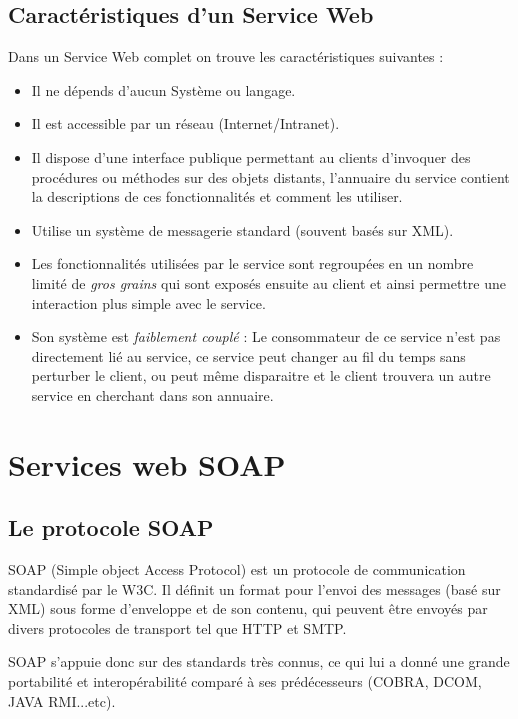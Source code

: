 		\subsection{Caractéristiques d'un Service Web}
		Dans un Service Web complet on trouve les caractéristiques suivantes :\cite{refTutorialPointsWS}
		\begin{itemize}
		\item Il ne dépends d'aucun Système ou langage.
		\item Il est accessible par un réseau (Internet/Intranet).
		\item Il dispose d'une interface publique permettant au clients d'invoquer des procédures ou méthodes sur des objets distants, l'annuaire du service contient la descriptions de ces fonctionnalités et comment les utiliser.
		\item Utilise un système de messagerie standard (souvent basés sur XML).
		\item Les fonctionnalités utilisées par le service sont regroupées en un nombre limité de \emph{gros grains} qui sont exposés ensuite au client et ainsi permettre une interaction plus simple avec le service.
		\item Son système est \emph{faiblement couplé} : Le consommateur de ce service n'est pas directement lié au service, ce service peut changer au fil du temps sans perturber le client, ou peut même disparaitre et le client trouvera un autre service en cherchant dans son annuaire.
		\end{itemize}
		\newpage
		\section{Services web SOAP} 
			\subsection{Le protocole SOAP}
				SOAP (Simple object Access Protocol) est un protocole de communication standardisé par le W3C. 
				Il définit un format pour l'envoi des messages (basé sur XML) sous forme d'enveloppe et de son contenu, qui peuvent être envoyés par divers protocoles de transport tel que HTTP et SMTP.
				
				SOAP s'appuie donc sur des standards très connus, ce qui lui a donné une grande portabilité et interopérabilité comparé à ses prédécesseurs (COBRA, DCOM, JAVA RMI...etc).
				
